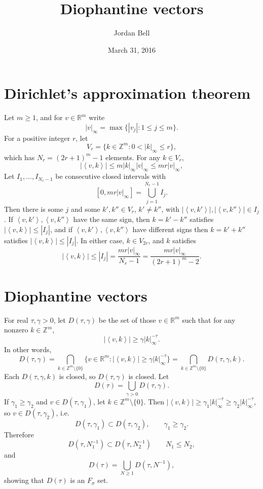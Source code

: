 \documentclass{article}
\newcommand{\inner}[2]{\left\langle #1, #2 \right\rangle}
\theoremstyle{definition}
\begin{document}
\title{Diophantine vectors}
\author{Jordan Bell}
\date{March 31, 2016}

\maketitle


\section{Dirichlet's approximation theorem}
Let $m \geq 1$, and
for $v \in \mathbb{R}^m$ write
\[
|v|_\infty = \max \{|v_j|:1 \leq j \leq m\}.
\]
For a positive integer $r$, let
\[
V_r = \{k \in \mathbb{Z}^m: 0 < |k|_\infty \leq r\},
\] 
which has $N_r=(2r+1)^m-1$ elements. 
For any $k \in V_r$,
\[
|\inner{v}{k}| \leq m |k|_\infty |v|_\infty \leq m r |v|_\infty,
\]
Let $I_1,\ldots,I_{N_r-1}$ be consecutive closed intervals with
\[
[0,mr|v|_\infty] = \bigcup_{j=1}^{N_r-1} I_j.
\]
Then there is some $j$ and some $k',k'' \in V_r$, $k' \neq k''$, with $|\inner{v}{k'}|,|\inner{v}{k''}| \in I_j$.
If $\inner{v}{k'}, \inner{v}{k''}$ have the same sign, then $k=k'-k''$ satisfies
$|\inner{v}{k}| \leq |I_j|$, and if
$\inner{v}{k'},\inner{v}{k''}$ have different signs then
$k=k'+k''$ satisfies $|\inner{v}{k}| \leq |I_j|$.
In either case, $k \in V_{2r}$, and $k$ satisfies
\[
|\inner{v}{k}| \leq |I_j| =  \frac{mr|v|_\infty}{N_r-1} = \frac{mr|v|_\infty}{(2r+1)^m-2}.
\]




\section{Diophantine vectors}
For real $\tau,\gamma>0$,
let
$D(\tau,\gamma)$ be the set of those $v \in \mathbb{R}^m$ such that for any nonzero $k \in \mathbb{Z}^m$,
\[
|\inner{v}{k}| \geq \gamma |k|_\infty^{-\tau}.
\]
In other words, 
\[
D(\tau,\gamma) =  \bigcap_{k \in \mathbb{Z}^m \setminus \{0\}} \{v \in \mathbb{R}^m: |\inner{v}{k}| \geq \gamma |k|_\infty^{-\tau}\}
= \bigcap_{k \in \mathbb{Z}^m \setminus \{0\}} D(\tau,\gamma,k).
\]
Each $D(\tau,\gamma,k)$ is closed, so $D(\tau,\gamma)$ is closed. 
Let 
\[
D(\tau) = \bigcup_{\gamma>0} D(\tau,\gamma).
\]
If $\gamma_1 \geq \gamma_2$ and $v \in D(\tau,\gamma_1)$, let $k \in \mathbb{Z}^m \setminus \{0\}$. Then
$|\inner{v}{k}| \geq \gamma_1 |k|_\infty^{-\tau} \geq \gamma_2 |k|_\infty^{-\tau}$, so
$v \in D(\tau,\gamma_2)$, i.e. 
\[
D(\tau,\gamma_1) \subset D(\tau,\gamma_2),\qquad \gamma_1 \geq \gamma_2.
\] 
Therefore
\[
D(\tau,N_1^{-1}) \subset D(\tau,N_2^{-1})\qquad N_1 \leq N_2,
\]
and
\[
D(\tau) = \bigcup_{N \geq 1} D(\tau,N^{-1}),
\]
showing that $D(\tau)$ is an $F_\sigma$ set.
\end{document}
